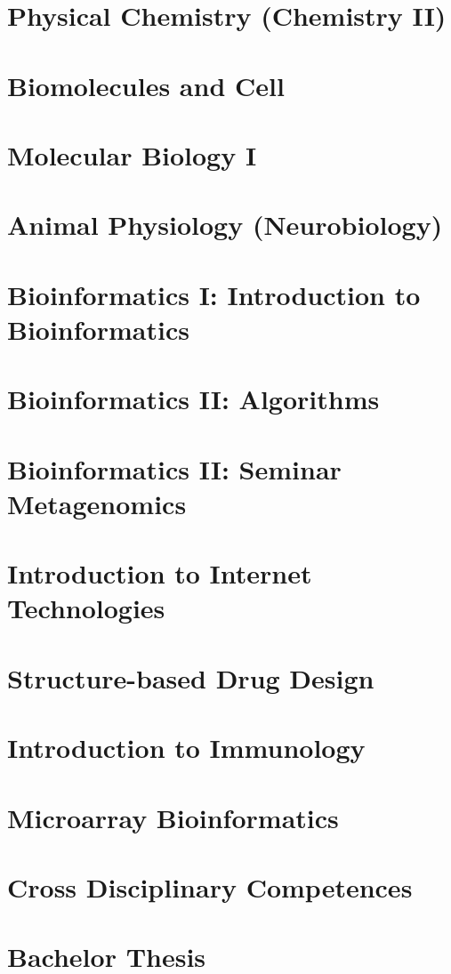 \chapter{Physical Chemistry (Chemistry II)}


\chapter{Biomolecules and Cell}


\chapter{Molecular Biology I}


\chapter{Animal Physiology (Neurobiology)}


\chapter{Bioinformatics I: Introduction to Bioinformatics}


\chapter{Bioinformatics II: Algorithms}


\chapter{Bioinformatics II: Seminar Metagenomics}


\chapter{Introduction to Internet Technologies}


\chapter{Structure-based Drug Design}


\chapter{Introduction to Immunology}


\chapter{Microarray Bioinformatics}


\chapter{Cross Disciplinary Competences}


\chapter{Bachelor Thesis}
